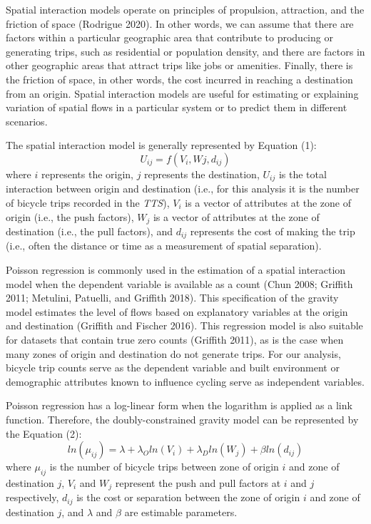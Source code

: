 \documentclass[smallextended]{svjour3}       %
\begin{document}
Spatial interaction models operate on principles of propulsion,
attraction, and the friction of space (Rodrigue 2020). In other words,
we can assume that there are factors within a particular geographic area
that contribute to producing or generating trips, such as residential or
population density, and there are factors in other geographic areas that
attract trips like jobs or amenities. Finally, there is the friction of
space, in other words, the cost incurred in reaching a destination from
an origin. Spatial interaction models are useful for estimating or
explaining variation of spatial flows in a particular system or to
predict them in different scenarios.

The spatial interaction model is generally represented by Equation (1):
\[
U_{ij} = f(V_i, Wj, d_{ij})
\] \noindent where \(i\) represents the origin, \(j\) represents the
destination, \(U_{ij}\) is the total interaction between origin and
destination (i.e., for this analysis it is the number of bicycle trips
recorded in the \emph{TTS}), \(V_i\) is a vector of attributes at the
zone of origin (i.e., the push factors), \(W_j\) is a vector of
attributes at the zone of destination (i.e., the pull factors), and
\(d_{ij}\) represents the cost of making the trip (i.e., often the
distance or time as a measurement of spatial separation).

Poisson regression is commonly used in the estimation of a spatial
interaction model when the dependent variable is available as a count
(Chun 2008; Griffith 2011; Metulini, Patuelli, and Griffith 2018). This
specification of the gravity model estimates the level of flows based on
explanatory variables at the origin and destination (Griffith and
Fischer 2016). This regression model is also suitable for datasets that
contain true zero counts (Griffith 2011), as is the case when many zones
of origin and destination do not generate trips. For our analysis,
bicycle trip counts serve as the dependent variable and built
environment or demographic attributes known to influence cycling serve
as independent variables.

Poisson regression has a log-linear form when the logarithm is applied
as a link function. Therefore, the doubly-constrained gravity model can
be represented by the Equation (2): \[
ln(\mu_{ij}) = \lambda + \lambda_O ln(V_i) + \lambda_Dln(W_j) + \beta ln(d_{ij})
\] \noindent where \(\mu_{ij}\) is the number of bicycle trips between
zone of origin \(i\) and zone of destination \(j\), \(V_i\) and \(W_j\)
represent the push and pull factors at \(i\) and \(j\) respectively,
\(d_{ij}\) is the cost or separation between the zone of origin \(i\)
and zone of destination \(j\), and \(\lambda\) and \(\beta\) are
estimable parameters.
\end{document}
